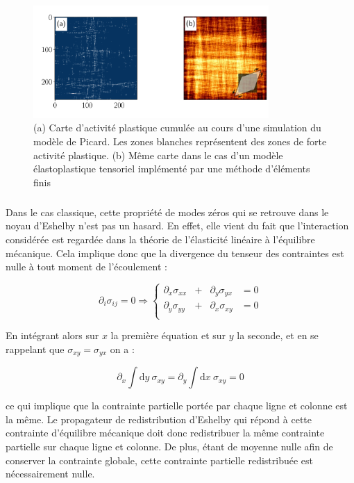 \begin{figure}[h]
	\centering
	\includegraphics[width=0.8\textwidth]{Chapitre4/Figures/CourtePortee/StrainLoc.pdf}
	\caption{(a) Carte d'activité plastique cumulée au cours d'une simulation du modèle de Picard. Les zones blanches représentent des zones de forte activité plastique. (b) Même carte dans le cas d'un modèle élastoplastique tensoriel implémenté par une méthode d'éléments finis \cite{budrikis_universal_2017}}
	\label{fig:FractalDim}
\end{figure} 

\subparagraph{}Dans le cas classique, cette propriété de modes zéros qui se retrouve dans le noyau d'Eshelby n'est pas un hasard. En effet, elle vient du fait que l'interaction considérée est regardée dans la théorie de l’élasticité linéaire à l'équilibre mécanique. Cela implique donc que la divergence du tenseur des contraintes est nulle à tout moment de l'écoulement :

\begin{equation}
	\partial_i\sigma_{ij} = 0 \Rightarrow \left\{
    \begin{array}{lccc}
    \partial_x \sigma_{xx} & +& \partial_y \sigma_{yx} & =0 \\
    \partial_y \sigma_{yy} & +& \partial_x \sigma_{xy} & =0 \\
    \end{array}
    \right.
\end{equation}

\noindent En intégrant alors sur $x$ la première équation et sur $y$ la seconde, et en se rappelant que $\sigma_{xy} = \sigma_{yx}$ on a :

\begin{equation}
	\partial_x \int \mathrm{d}y~ \sigma_{xy} = \partial_y \int \mathrm{d}x~ \sigma_{xy} = 0
\end{equation}

\noindent ce qui implique que la contrainte partielle portée par chaque ligne et colonne est la même. Le propagateur de redistribution d'Eshelby qui répond à cette contrainte d'équilibre mécanique doit donc redistribuer la même contrainte partielle sur chaque ligne et colonne. De plus, étant de moyenne nulle afin de conserver la contrainte globale, cette contrainte partielle redistribuée est nécessairement nulle.


